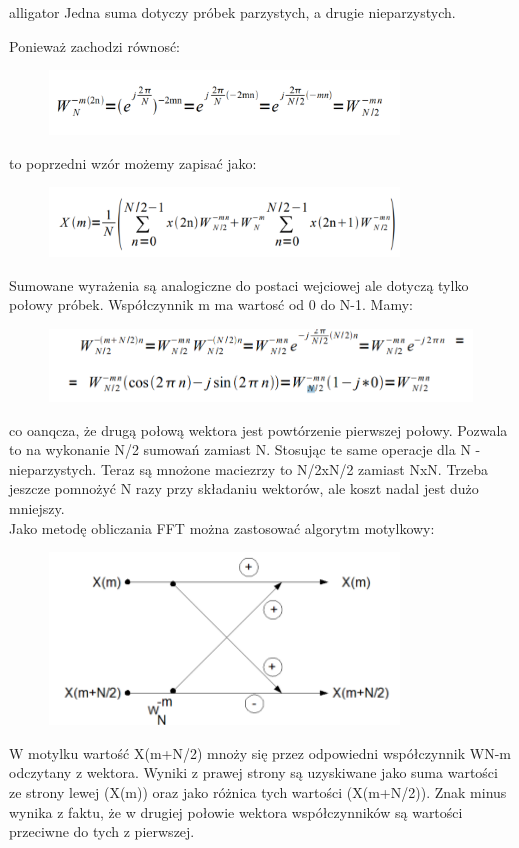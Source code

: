 \documentclass[12pt]{article}
\begin{document}
\begin{labeling}{alligator}
Jedna suma dotyczy próbek parzystych, a drugie nieparzystych.

Ponieważ zachodzi równosć:
\begin{figure}[h!]
 \centering
 \includegraphics[width=9.3cm]{rownosc.PNG}
 \vspace{-0.3cm}
 \label{filtrS}
\end{figure}
to poprzedni wzór możemy zapisać jako:
\begin{figure}[h!]
 \centering
 \includegraphics[width=9.3cm]{FFTr.PNG}
 \vspace{-0.3cm}
 \label{filtrS}
\end{figure}

Sumowane wyrażenia są analogiczne do  postaci wejciowej ale dotyczą tylko połowy próbek. Współczynnik m ma wartosć od 0 do N-1.
Mamy:
\begin{figure}[h!]
 \centering
 \includegraphics[width=12.3cm]{mamy.PNG}
 \vspace{-0.3cm}
 \label{sp}
\end{figure}
co oanqcza, że drugą połową wektora jest powtórzenie pierwszej połowy. Pozwala to na wykonanie N/2 sumowań zamiast N. Stosując te same operacje dla N - nieparzystych. Teraz są mnożone maciezrzy to N/2xN/2 zamiast NxN. Trzeba jeszcze pomnożyć N razy przy składaniu wektorów, ale koszt nadal jest dużo mniejszy.
\\ Jako metodę obliczania FFT można zastosować algorytm motylkowy:
\begin{figure}[h!]
 \centering
 \includegraphics[width=9.3cm]{motylek.PNG}
 \vspace{-0.3cm}
 \label{sp}
\end{figure}
W motylku wartość X(m+N/2) mnoży się przez odpowiedni współczynnik WN-m odczytany z wektora. Wyniki z prawej strony są uzyskiwane jako suma wartości ze strony lewej (X(m)) oraz jako różnica tych wartości (X(m+N/2)). Znak minus wynika z faktu, że w drugiej połowie wektora współczynników są wartości przeciwne do tych z pierwszej.  



\end{labeling}
\end{document}
